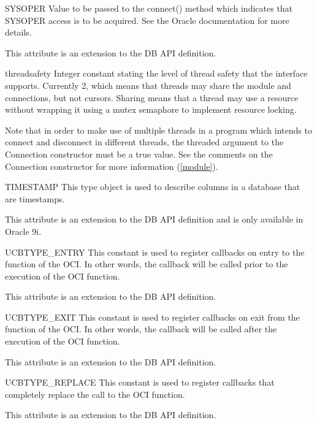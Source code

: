 \documentclass{manual}
\begin{document}
\begin{datadesc}{SYSOPER}
  Value to be passed to the connect() method which indicates that SYSOPER
  access is to be acquired. See the Oracle documentation for more details.

   This attribute is an extension to the DB API definition.
\end{datadesc}

\begin{datadesc}{threadsafety}
  Integer constant stating the level of thread safety that the interface
  supports. Currently 2, which means that threads may share the module and
  connections, but not cursors. Sharing means that a thread may use a resource
  without wrapping it using a mutex semaphore to implement resource locking.

  Note that in order to make use of multiple threads in a program which intends
  to connect and disconnect in different threads, the threaded argument to the
  Connection constructor must be a true value. See the comments on the
  Connection constructor for more information (\ref{module}).
\end{datadesc}

\begin{datadesc}{TIMESTAMP}
  This type object is used to describe columns in a database that are
  timestamps.

   This attribute is an extension to the DB API definition and
  is only available in Oracle 9i.
\end{datadesc}

\begin{datadesc}{UCBTYPE_ENTRY}
  This constant is used to register callbacks on entry to the function
  of the OCI. In other words, the callback will be called prior to the
  execution of the OCI function.

   This attribute is an extension to the DB API definition.
\end{datadesc}

\begin{datadesc}{UCBTYPE_EXIT}
  This constant is used to register callbacks on exit from the function
  of the OCI. In other words, the callback will be called after the execution
  of the OCI function.

   This attribute is an extension to the DB API definition.
\end{datadesc}

\begin{datadesc}{UCBTYPE_REPLACE}
  This constant is used to register callbacks that completely replace the
  call to the OCI function.

   This attribute is an extension to the DB API definition.
\end{datadesc}
\end{document}
